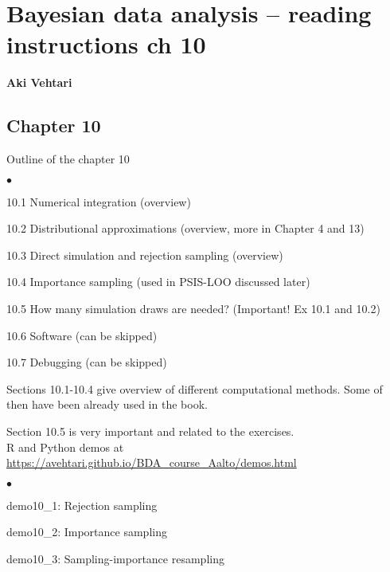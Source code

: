 \documentclass[a4paper,11pt,english]{article}
\begin{document}
\thispagestyle{empty}

\section*{Bayesian data analysis -- reading instructions ch 10} 
\smallskip
{\bf Aki Vehtari}
\smallskip

\subsection*{Chapter 10}

Outline of the chapter 10
\begin{list}{$\bullet$}{\parsep=0pt\itemsep=2pt}
\item 10.1 Numerical integration (overview)
\item 10.2 Distributional approximations (overview, more in Chapter 4 and 13)
\item 10.3 Direct simulation and rejection sampling (overview)
\item 10.4 Importance sampling (used in PSIS-LOO discussed later)
\item 10.5 How many simulation draws are needed? (Important! Ex 10.1 and 10.2)
\item 10.6 Software (can be skipped)
\item 10.7 Debugging (can be skipped)
\end{list}

Sections 10.1-10.4 give overview of different computational
methods. Some of then have been already used in the book.

Section 10.5 is very important and related to the exercises.\\

R and Python demos at \url{https://avehtari.github.io/BDA_course_Aalto/demos.html}
\begin{list}{$\bullet$}{\parsep=0pt\itemsep=2pt}
\item demo10\_1: Rejection sampling
\item demo10\_2: Importance sampling
\item demo10\_3: Sampling-importance resampling
\end{list}
\end{document}
